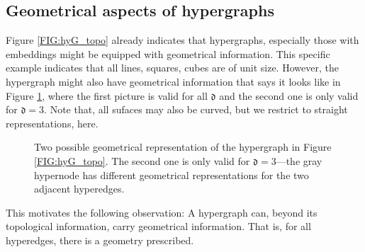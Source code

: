 \documentclass[a4paper, english, 12pt, reqno, draft]{amsart}
\theoremstyle{definition}
\theoremstyle{remark}
\numberwithin{equation}{section}
\newcommand{\locDim}{\ensuremath{\mathfrak d}}
\begin{document}
\subsection{Geometrical aspects of hypergraphs}\label{SEC:hypergraph_geometry}
% 
Figure \ref{FIG:hyG_topo} already indicates that hypergraphs, especially those with embeddings might be equipped with geometrical information. This specific example indicates that all lines, squares, cubes are of unit size. However, the hypergraph might also have geometrical information that says it looks like in Figure \ref{FIG:hyG_geom}, where the first picture is valid for all $\locDim$ and the second one is only valid for $\locDim = 3$. Note that, all sufaces may also be curved, but we restrict to straight representations, here.
% 
\begin{figure}[ht]
 \quad
 \caption{Two possible geometrical representation of the hypergraph in Figure \ref{FIG:hyG_topo}. The second one is only valid for $\locDim = 3$---the gray hypernode has different geometrical representations for the two adjacent hyperedges.}\label{FIG:hyG_geom}
\end{figure}

This motivates the following observation: A hypergraph can, beyond its topological information, carry geometrical information. That is, for all hyperedges, there is a geometry prescribed.
\end{document}
